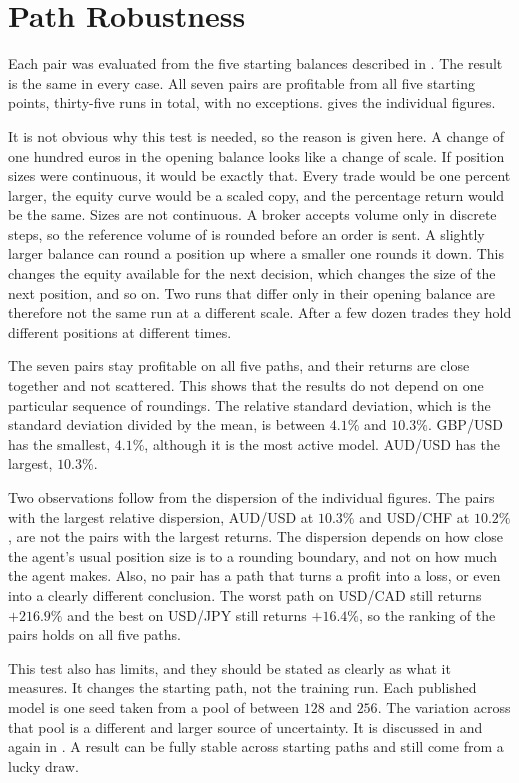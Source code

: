 \section{Path Robustness}
\label{Section:PathRobustness}

Each pair was evaluated from the five starting balances described in . The result is the same in every case. All seven pairs are profitable from all five starting points, thirty-five runs in total, with no exceptions.  gives the individual figures.



It is not obvious why this test is needed, so the reason is given here. A change of one hundred euros in the opening balance looks like a change of scale. If position sizes were continuous, it would be exactly that. Every trade would be one percent larger, the equity curve would be a scaled copy, and the percentage return would be the same. Sizes are not continuous. A broker accepts volume only in discrete steps, so the reference volume of  is rounded before an order is sent. A slightly larger balance can round a position up where a smaller one rounds it down. This changes the equity available for the next decision, which changes the size of the next position, and so on. Two runs that differ only in their opening balance are therefore not the same run at a different scale. After a few dozen trades they hold different positions at different times.

The seven pairs stay profitable on all five paths, and their returns are close together and not scattered. This shows that the results do not depend on one particular sequence of roundings. The relative standard deviation, which is the standard deviation divided by the mean, is between $4.1\%$ and $10.3\%$. GBP/USD has the smallest, $4.1\%$, although it is the most active model. AUD/USD has the largest, $10.3\%$.

Two observations follow from the dispersion of the individual figures. The pairs with the largest relative dispersion, AUD/USD at $10.3\%$ and USD/CHF at $10.2\%$, are not the pairs with the largest returns. The dispersion depends on how close the agent's usual position size is to a rounding boundary, and not on how much the agent makes. Also, no pair has a path that turns a profit into a loss, or even into a clearly different conclusion. The worst path on USD/CAD still returns $+216.9\%$ and the best on USD/JPY still returns $+16.4\%$, so the ranking of the pairs holds on all five paths.

This test also has limits, and they should be stated as clearly as what it measures. It changes the starting path, not the training run. Each published model is one seed taken from a pool of between $128$ and $256$. The variation across that pool is a different and larger source of uncertainty. It is discussed in  and again in . A result can be fully stable across starting paths and still come from a lucky draw.